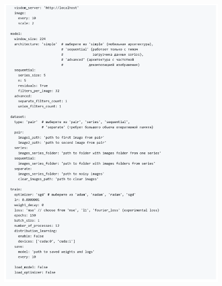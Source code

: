 \documentclass[14pt]{mmcs_article}
\begin{document}
\begin{appendices}
\begin{figure}[h]
	\centering
	\includegraphics[width=\textwidth]{img/markdown/README_2}
	\label{fig:markdown_2}
\end{figure}


\end{appendices}
\end{document}
